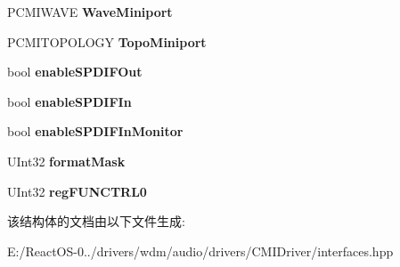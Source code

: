 \begin{DoxyCompactItemize}
\mbox{\label{struct_c_m_i8738_info_a0d6c6aa68740ec47f14dc56502bd564a}} 
P\+C\+M\+I\+W\+A\+VE {\bfseries Wave\+Miniport}
\item 
\mbox{\label{struct_c_m_i8738_info_a3bea1bb8b95088e35e7c595833b60407}} 
P\+C\+M\+I\+T\+O\+P\+O\+L\+O\+GY {\bfseries Topo\+Miniport}
\item 
\mbox{\label{struct_c_m_i8738_info_add73314bb3034ebffda3cde9f86106f3}} 
bool {\bfseries enable\+S\+P\+D\+I\+F\+Out}
\item 
\mbox{\label{struct_c_m_i8738_info_a374560a662af9c425b8d5cff51084b92}} 
bool {\bfseries enable\+S\+P\+D\+I\+F\+In}
\item 
\mbox{\label{struct_c_m_i8738_info_a47b460db9ee083ef2250b99a11beb95e}} 
bool {\bfseries enable\+S\+P\+D\+I\+F\+In\+Monitor}
\item 
\mbox{\label{struct_c_m_i8738_info_a7e6f3f409772b5f8d35437ec7011cc24}} 
U\+Int32 {\bfseries format\+Mask}
\item 
\mbox{\label{struct_c_m_i8738_info_a10030e9e388f2b0039f605385288dd01}} 
U\+Int32 {\bfseries reg\+F\+U\+N\+C\+T\+R\+L0}
\end{DoxyCompactItemize}


该结构体的文档由以下文件生成\+:\begin{DoxyCompactItemize}
\item 
E\+:/\+React\+O\+S-\/0../drivers/wdm/audio/drivers/\+C\+M\+I\+Driver/interfaces.\+hpp\end{DoxyCompactItemize}
